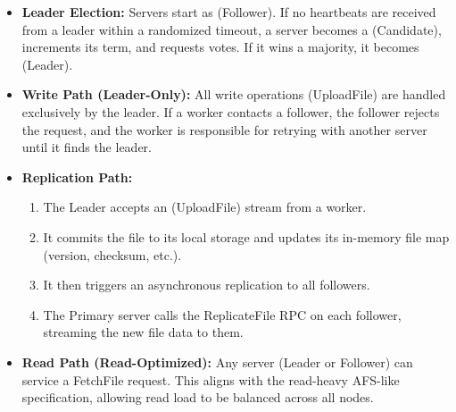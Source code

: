 \documentclass[11pt, a4paper]{article}
\begin{document}
\begin{itemize}
    \item \textbf{Leader Election:} Servers start as (Follower). If no heartbeats are received from a leader within a randomized timeout, a server becomes a (Candidate), increments its term, and requests votes. If it wins a majority, it becomes (Leader).
    \item \textbf{Write Path (Leader-Only):} All write operations (UploadFile) are handled exclusively by the leader. If a worker contacts a follower, the follower rejects the request, and the worker is responsible for retrying with another server until it finds the leader.
    \item \textbf{Replication Path:}
          \begin{enumerate}
              \item The Leader accepts an (UploadFile) stream from a worker.
              \item It commits the file to its local storage and updates its in-memory file map (version, checksum, etc.).
              \item It then triggers an asynchronous replication to all followers.
              \item The Primary server calls the ReplicateFile RPC on each follower, streaming the new file data to them.
          \end{enumerate}
    \item \textbf{Read Path (Read-Optimized):} Any server (Leader or Follower) can service a FetchFile request. This aligns with the read-heavy AFS-like specification, allowing read load to be balanced across all nodes.
\end{itemize}
\end{document}

